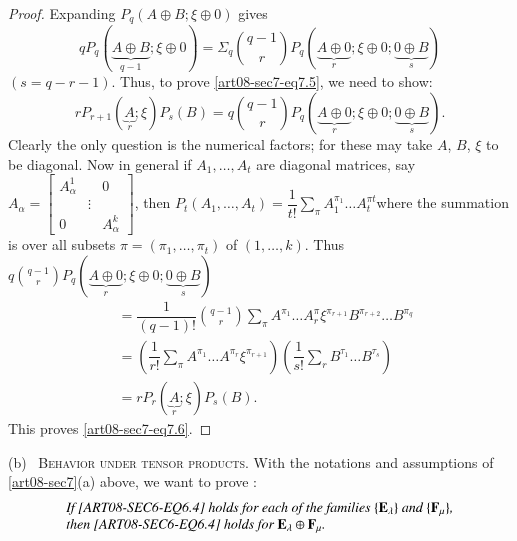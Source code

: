 \begin{proof}
Expanding $P_{q}(A\oplus B;\xi\oplus 0)$ gives
$$
qP_{q}(\underbrace{A\oplus B}_{q-1};\xi\oplus 0)=\Sigma_{q}\binom{q-1}{r}P_{q}(\underbrace{A\oplus 0}_{r};\xi\oplus 0;\underbrace{0\oplus B}_{s})
$$
$(s=q-r-1)$. Thus, to prove \eqref{art08-sec7-eq7.5}, we need to show:
\begin{equation}
rP_{r+1}(\underbrace{A}_{r};\xi)P_{s}(B)=q\binom{q-1}{r}P_{q}(\underbrace{A\oplus 0}_{r};\xi\oplus 0; \underbrace{0\oplus B}_{s}).\label{art08-sec7-eq7.6}
\end{equation}
Clearly the only question is the numerical factors; for these may take $A$, $B$, $\xi$ to be diagonal. Now in general if $A_{1},\ldots,A_{t}$ are diagonal matrices, say $A_{\alpha}=\left[\begin{smallmatrix} A^{1}_{\alpha} & & 0\\ & \vdots & \\ 0 & & A^{k}_{\alpha}\end{smallmatrix}\right]$, then $P_{t}(A_{1},\ldots,A_{t})=\dfrac{1}{t!}\sum\limits_{\pi}A^{\pi_{1}}_{1}\ldots A^{\pi t}_{t}$\pageoriginale where the summation is over all subsets $\pi=(\pi_{1},\ldots,\pi_{t})$ of $(1,\ldots,k)$. Thus $q\binom{q-1}{r}P_{q}(\underbrace{A\oplus 0}_{r};\xi\oplus 0; \underbrace{0\oplus B}_{s})$
\begin{align*}
&= \dfrac{1}{(q-1)!}\binom{q-1}{r}\sum\limits_{\pi}A^{\pi_{1}}\ldots A^{\pi}_{r}\xi^{\pi_{r+1}}B^{\pi_{r+2}}\ldots B^{\pi_{q}}\\[3pt]
&= \left(\dfrac{1}{r!}\sum\limits_{\pi}A^{\pi_{1}}\ldots A^{\pi_{r}}\xi^{\pi_{r+1}}\right)\left(\dfrac{1}{s!}\sum\limits_{r}B^{\tau_{1}}\ldots B^{\tau_{s}}\right)\\[3pt]
&= rP_{r}(\underbrace{A}_{r};\xi)P_{s}(B).
\end{align*}
This proves \eqref{art08-sec7-eq7.6}.
\end{proof}

(b)~ \textsc{Behavior under tensor products.} With the notations and assumptions of \ref{art08-sec7}(a) above, we want to prove :
\begin{equation}
\begin{array}{l}
\text{\em If \eqref{ART08-SEC6-EQ6.4} holds for each of the families $\{\mathbf{E}_{\lambda}\}$ and $\{\mathbf{F}_{\mu}\}$,}\\
\text{\em then \eqref{ART08-SEC6-EQ6.4} holds for $\mathbf{E}_{\lambda}\oplus \mathbf{F}_{\mu}$.}
\end{array}\label{art08-sec7-eq7.7}
\end{equation}

